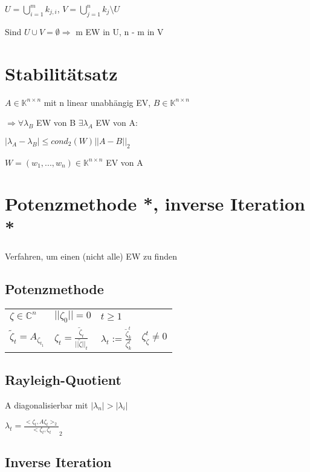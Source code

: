 \documentclass[12pt,a4paper]{article} %
\begin{document}
	$U = \bigcup\limits_{i = 1}^mk_{j, i}$, $V = \bigcup\limits_{j = 1}^nk_j \text{\textbackslash} U$
	
	Sind $U \cup V = \emptyset \Rightarrow$ m EW in U, n - m in V
	
	\newpage
	
	\section{Stabilitätsatz}
	
	$A \in \mathbb{K}^{n \times n}$ mit n linear unabhängig EV, $B \in \mathbb{K}^{n \times n}$
	
	$\Rightarrow \forall \lambda_B$ EW von B $\exists \lambda_A$ EW von A:
	
	$|\lambda_A - \lambda_B| \le cond_2(W) ||A - B||_2$
	
	$W = (w_1, ..., w_n) \in \mathbb{K}^{n \times n}$ EV von A
	
	\newpage
	
	\section{Potenzmethode *, inverse Iteration *}
	
	Verfahren, um einen (nicht alle) EW zu finden
	
	\subsection{Potenzmethode}
	\begin{tabular}{l l l l}
		$\zeta \in \mathbb{C}^n$ & $||\zeta_0|| = 0$ & $t \ge 1$ & \\
		$\tilde{\zeta}_t = A_{\zeta_{t_1}}$ & $\zeta_t = \frac{\tilde{\zeta}_t}{||\tilde{\zeta}||_t}$ & $\lambda_t := \frac{\tilde{\zeta}_k^t}{\zeta_k^t}$ & $\zeta_\zeta^t \ne 0$
	\end{tabular}
	
	\subsection{Rayleigh-Quotient}
	
	A diagonalisierbar mit $|\lambda_n| > |\lambda_i|$
	
	$\lambda_t = \frac{<\zeta_t, A\zeta_t>_2}{<\zeta_t, \zeta_t}_2$
	
	\subsection{Inverse Iteration}
	
\end{document}
